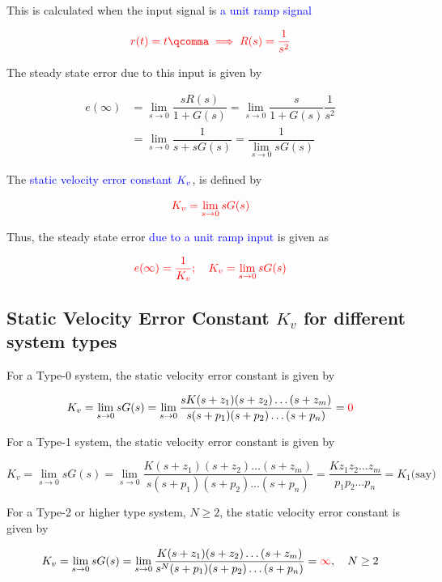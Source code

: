 \documentclass[
  14pt,
  a4paper,
  oneside,
  open=any,
  a4paper,
  14pt]{report}
\begin{document}
This is calculated when the input signal is \textcolor{blue}{a unit ramp
signal}

\[
    \textcolor{red}{r(t) = t\qcomma \implies R(s) = \dfrac{1}{s^2}}
\]

The steady state error due to this input is given by

\[
\begin{aligned}
    e(\infty) &= \lim_{s \to 0} \dfrac{sR(s)}{1+G(s)} = \lim_{s \to 0} \dfrac{s}{1+G(s)} \dfrac{1}{s^2} \\
    &= \lim_{s \to 0} \dfrac{1}{s+sG(s)} = \dfrac{1}{\lim\limits_{s \to 0} sG(s)}
\end{aligned}
\]

The \textcolor{blue}{static velocity error constant}
\(\textcolor{blue}{K_v}\), is defined by

\[
    \textcolor{red}{K_v = \lim_{s \to 0} sG(s)}
\]

Thus, the steady state error \textcolor{blue}{due to a unit ramp input}
is given as

\[
    \textcolor{red}{e(\infty) = \dfrac{1}{K_v}; \quad K_v = \lim_{s \to 0} sG(s)}
\]

\subsection{\texorpdfstring{Static Velocity Error Constant \(K_v\) for
different system
types}{Static Velocity Error Constant K\_v for different system types}}\label{static-velocity-error-constant-k_v-for-different-system-types}

For a Type-0 system, the static velocity error constant is given by

\[
    K_v = \lim_{s \to 0} sG(s) = \lim_{s \to 0} \dfrac{sK(s+z_1)(s+z_2)\ldots(s+z_m)}{s(s+p_1)(s+p_2)\ldots(s+p_n)} = \textcolor{red}{0}
\]

For a Type-1 system, the static velocity error constant is given by

\[
    K_v = \lim_{s \to 0} sG(s) = \lim_{s \to 0} \dfrac{K(s+z_1)(s+z_2)\ldots(s+z_m)}{s(s+p_1)(s+p_2)\ldots(s+p_n)} = \dfrac{Kz_1z_2\ldots z_m}{p_1p_2\ldots p_n} = K_1 \text{(say)}
\]

For a Type-2 or higher type system, \(N \geq 2\), the static velocity
error constant is given by

\[
    K_v = \lim_{s \to 0} sG(s) = \lim_{s \to 0} \dfrac{K(s+z_1)(s+z_2)\ldots(s+z_m)}{s^N(s+p_1)(s+p_2)\ldots(s+p_n)} = \textcolor{red}{\infty}, \quad N \geq 2
\]
\end{document}
